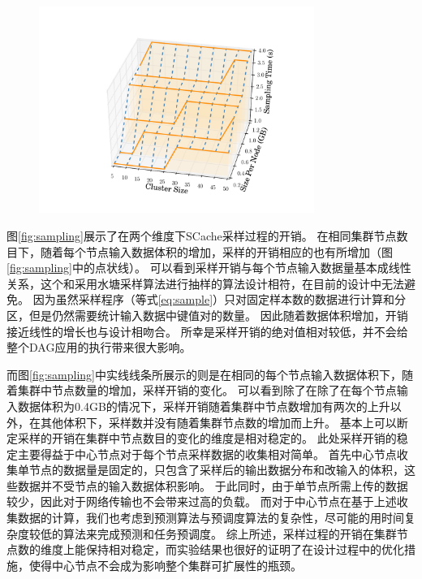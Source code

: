 \begin{figure}[!htp]
	\centering
	\includegraphics[width=0.8\textwidth]{../../PPoPP-2018/fig/sampling.pdf}
\end{figure}

图\ref{fig:sampling}展示了在两个维度下SCache采样过程的开销。
在相同集群节点数目下，随着每个节点输入数据体积的增加，采样的开销相应的也有所增加（图\ref{fig:sampling}中的点状线）。
可以看到采样开销与每个节点输入数据量基本成线性关系，这个和采用水塘采样算法进行抽样的算法设计相符，在目前的设计中无法避免。
因为虽然采样程序（等式\ref{eq:sample}）只对固定样本数的数据进行计算和分区，但是仍然需要统计输入数据中键值对的数量。
因此随着数据体积增加，开销接近线性的增长也与设计相吻合。
所幸是采样开销的绝对值相对较低，并不会给整个DAG应用的执行带来很大影响。

而图\ref{fig:sampling}中实线线条所展示的则是在相同的每个节点输入数据体积下，随着集群中节点数量的增加，采样开销的变化。
可以看到除了在除了在每个节点输入数据体积为0.4GB的情况下，采样开销随着集群中节点数增加有两次的上升以外，在其他体积下，采样数并没有随着集群节点数的增加而上升。
基本上可以断定采样的开销在集群中节点数目的变化的维度是相对稳定的。
此处采样开销的稳定主要得益于中心节点对于每个节点采样数据的收集相对简单。
首先中心节点收集单节点的数据量是固定的，只包含了采样后的输出数据分布和改输入的体积，这些数据并不受节点的输入数据体积影响。
于此同时，由于单节点所需上传的数据较少，因此对于网络传输也不会带来过高的负载。
而对于中心节点在基于上述收集数据的计算，我们也考虑到预测算法与预调度算法的复杂性，尽可能的用时间复杂度较低的算法来完成预测和任务预调度。
综上所述，采样过程的开销在集群节点数的维度上能保持相对稳定，而实验结果也很好的证明了在设计过程中的优化措施，使得中心节点不会成为影响整个集群可扩展性的瓶颈。

